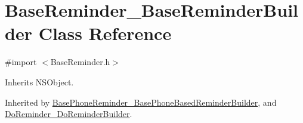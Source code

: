 \hypertarget{interface_base_reminder___base_reminder_builder}{}\section{Base\+Reminder\+\_\+\+Base\+Reminder\+Builder Class Reference}
\label{interface_base_reminder___base_reminder_builder}


{\ttfamily \#import $<$Base\+Reminder.\+h$>$}



Inherits N\+S\+Object.



Inherited by \hyperlink{interface_base_phone_reminder___base_phone_based_reminder_builder}{Base\+Phone\+Reminder\+\_\+\+Base\+Phone\+Based\+Reminder\+Builder}, and \hyperlink{interface_do_reminder___do_reminder_builder}{Do\+Reminder\+\_\+\+Do\+Reminder\+Builder}.

